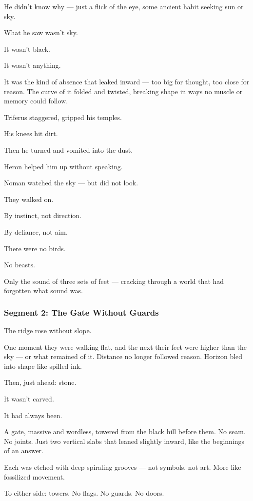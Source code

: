\documentclass[9pt]{article}
\begin{document}
He didn’t know why — just a flick of the eye, some ancient habit seeking sun or sky.

What he saw wasn’t sky.

It wasn’t black.

It wasn’t anything.

It was the kind of absence that leaked inward — too big for thought, too close for reason. The curve of it folded and twisted, breaking shape in ways no muscle or memory could follow.

Triferus staggered, gripped his temples.

His knees hit dirt.

Then he turned and vomited into the dust.

Heron helped him up without speaking.

Noman watched the sky — but did not look.

\bigskip

They walked on.

By instinct, not direction.

By defiance, not aim.

There were no birds.

No beasts.

Only the sound of three sets of feet — cracking through a world that had forgotten what sound was.

\newpage

\subsubsection*{Segment 2: The Gate Without Guards}

The ridge rose without slope.

One moment they were walking flat, and the next their feet were higher than the sky — or what remained of it. Distance no longer followed reason. Horizon bled into shape like spilled ink.

Then, just ahead: stone.

It wasn’t carved.

It had always been.

A gate, massive and wordless, towered from the black hill before them. No seam. No joints. Just two vertical slabs that leaned slightly inward, like the beginnings of an answer.

Each was etched with deep spiraling grooves — not symbols, not art. More like fossilized movement.

To either side: towers. No flags. No guards. No doors.
\end{document}
